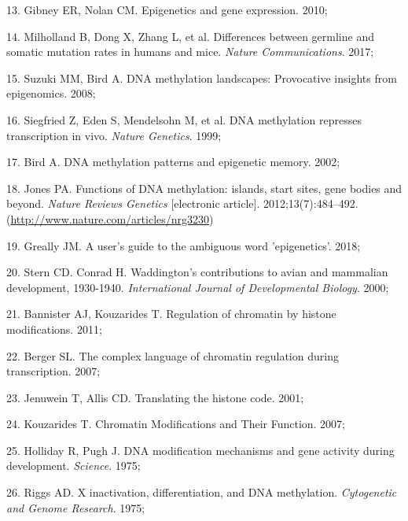 \documentclass[11pt,oneside]{bristolthesis}
\newenvironment{cslreferences}%
  {}%
  {\par}
\begin{document}
\begin{cslreferences}
\leavevmode\hypertarget{ref-Gibney2010}{}%
13. Gibney ER, Nolan CM. Epigenetics and gene expression. 2010;

\leavevmode\hypertarget{ref-Milholland2017}{}%
14. Milholland B, Dong X, Zhang L, et al. Differences between germline and somatic mutation rates in humans and mice. \emph{Nature Communications}. 2017;

\leavevmode\hypertarget{ref-Suzuki2008}{}%
15. Suzuki MM, Bird A. DNA methylation landscapes: Provocative insights from epigenomics. 2008;

\leavevmode\hypertarget{ref-Siegfried1999}{}%
16. Siegfried Z, Eden S, Mendelsohn M, et al. DNA methylation represses transcription in vivo. \emph{Nature Genetics}. 1999;

\leavevmode\hypertarget{ref-Bird2002}{}%
17. Bird A. DNA methylation patterns and epigenetic memory. 2002;

\leavevmode\hypertarget{ref-Jones2012}{}%
18. Jones PA. Functions of DNA methylation: islands, start sites, gene bodies and beyond. \emph{Nature Reviews Genetics} {[}electronic article{]}. 2012;13(7):484--492. (\url{http://www.nature.com/articles/nrg3230})

\leavevmode\hypertarget{ref-Greally2018}{}%
19. Greally JM. A user's guide to the ambiguous word 'epigenetics'. 2018;

\leavevmode\hypertarget{ref-Stern2000}{}%
20. Stern CD. Conrad H. Waddington's contributions to avian and mammalian development, 1930-1940. \emph{International Journal of Developmental Biology}. 2000;

\leavevmode\hypertarget{ref-Bannister2011}{}%
21. Bannister AJ, Kouzarides T. Regulation of chromatin by histone modifications. 2011;

\leavevmode\hypertarget{ref-Berger2007}{}%
22. Berger SL. The complex language of chromatin regulation during transcription. 2007;

\leavevmode\hypertarget{ref-Jenuwein2001}{}%
23. Jenuwein T, Allis CD. Translating the histone code. 2001;

\leavevmode\hypertarget{ref-Kouzarides2007}{}%
24. Kouzarides T. Chromatin Modifications and Their Function. 2007;

\leavevmode\hypertarget{ref-Holliday1975}{}%
25. Holliday R, Pugh J. DNA modification mechanisms and gene activity during development. \emph{Science}. 1975;

\leavevmode\hypertarget{ref-Riggs1975}{}%
26. Riggs AD. X inactivation, differentiation, and DNA methylation. \emph{Cytogenetic and Genome Research}. 1975;


\end{cslreferences}
\end{document}
